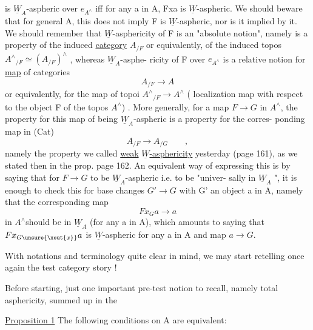 
is $\underline{W}_A$-aspheric over $e_{A^\wedge}$ iff for any a in A,  Fxa is $\underline{W}$-aspheric.  We
should beware that for general A,  this does not imply F is $\underline{W}$-aspheric,
nor is it implied by it.  We should remember that $\underline{W}$-asphericity of F is
an "absolute notion",  namely is a property of the induced \uline{category} $A_{/F}$
or equivalently,  of the induced topos $A^\wedge{}_{/F} \simeq (A_{/F})^\wedge$ ,  whereas $\underline{W}_A$-asphe-%
ricity of F over $e_{A^\wedge}$ is a relative notion for  \uline{map} of categories
\[ A_{/F} \longrightarrow A \]
or equivalently,  for the map of topoi  $A^\wedge{}_{/F} \to A^\wedge$  ( localization map
with respect to the object F of the topos $A^\wedge$) .  
  More generally,  for a map $F \to G$ in $A^\wedge$, the
property for this map of being $\underline{W}_A$-aspheric is a property for the corres-%
ponding map in (Cat)
\[ A_{/F} \longrightarrow A_{/G} \qquad , \]
namely the property we called  \uline{weak} \uline{$\underline{W}$-asphericity}  yesterday (page 161),
as we stated then in the prop. page 162.  An equivalent way of expressing
this is by saying that for $F \to G$ to be $\underline{W}_A$-aspheric  i.e. to be "univer-%
sally in $\underline{W}_A$ ",  it is enough to check this for base changes  $G' \to G$
with G' an object a in A,  namely that the corresponding map
\[ Fx_G a \longrightarrow a \]
in $A^\wedge$should be in $\underline{W}_A$ (for any a in A),  which amounts to saying that
$Fx_{G\unsure{\xout{x}}}a$  is $\underline{W}$-aspheric  for any a in A and map $a \to G$.

With notations and terminology quite clear in mind,  we may start
retelling once again the test category story !

 
Before starting,  just one important pre-test notion to recall,
namely total asphericity,  summed up in the

\uline{Proposition 1}   The following conditions on A are equivalent:

